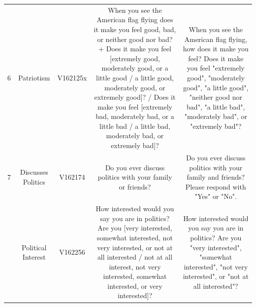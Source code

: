 \documentclass[11pt]{article}
\begin{document}
\begin{longtable}{ccccc}
    \multirow{16}{2em}{6} & \multirow{16}{4.5em}{Patriotism} & \multirow{16}{4em}{V162125x} & \multirow{16}{12em}{When you see the American flag flying does it make you feel good, bad, or neither good nor bad? + Does it make you feel [extremely good, moderately good, or a little good / a little good, moderately good, or extremely good]? / Does it make you feel [extremely bad, moderately bad, or a little bad / a little bad, moderately bad, or extremely bad]?} & \multirow{16}{12em}{When you see the American flag flying, how does it make you feel? Does it make you feel "extremely good", "moderately good", "a little good", "neither good nor bad", "a little bad", "moderately bad", or "extremely bad"?}\\&&&&\\&&&&\\&&&&\\&&&&\\&&&&\\&&&&\\&&&&\\&&&&\\&&&&\\&&&&\\&&&&\\&&&&\\&&&&\\&&&&\\&&&&\\
    \hline

    \multirow{5}{2em}{7} & \multirow{5}{4.5em}{Discusses Politics} & \multirow{5}{4em}{V162174} & \multirow{5}{12em}{Do you ever discuss politics with your family or friends?} & \multirow{5}{12em}{Do you ever discuss politics with your family and friends? Please respond with "Yes" or "No".}\\&&&&\\&&&&\\&&&&\\&&&&\\
    \hline

    \pagebreak

    \multirow{11}{2em}{8} & \multirow{11}{4.5em}{Political Interest} & \multirow{11}{4em}{V162256} & \multirow{11}{12em}{How interested would you say you are in politics? Are you [very interested, somewhat interested, not very interested, or not at all interested / not at all interest, not very interested, somewhat interested, or very interested]?} & \multirow{11}{12em}{How interested would you say you are in politics? Are you "very interested", "somewhat interested", "not very interested", or "not at all interested"?}\\&&&&\\&&&&\\&&&&\\&&&&\\&&&&\\&&&&\\&&&&\\&&&&\\&&&&\\&&&&\\
    \hline


\end{longtable}
\end{document}
